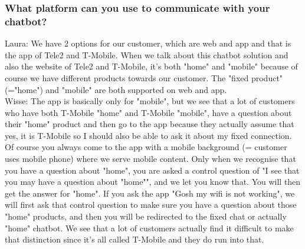 \begin{appendices}
	\subsubsection{What platform can you use to communicate with your chatbot?}
	Laura: We have 2 options for our customer, which are web and app and that is the app of Tele2 and T-Mobile. When we talk about this chatbot solution and also the website of Tele2 and T-Mobile, it's both "home" and "mobile" because of course we have different products towards our customer. The "fixed product" (="home") and "mobile" are both supported on web and app.\\
	\break
	Wisse: The app is basically only for "mobile", but we see that a lot of customers who have both T-Mobile "home" and T-Mobile "mobile", have a question about their "home" product and then go to the app because they actually assume that yes, it is T-Mobile so I should also be able to ask it about my fixed connection. Of course you always come to the app with a mobile background (= customer uses mobile phone) where we serve mobile content. Only when we recognise that you have a question about "home", you are asked a control question of "I see that you may have a question about "home"", and we let you know that. You will then get the answer for "home". If you ask the app "Gosh my wifi is not working", we will first ask that control question to make sure you have a question about those "home" products, and then you will be redirected to the fixed chat or actually "home" chatbot. We see that a lot of customers actually find it difficult to make that distinction since it's all called T-Mobile and they do run into that.\\
	

\end{appendices}
